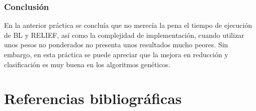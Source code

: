 \documentclass[12pt, spanish]{article}
\begin{document}
\subsubsection{}
\subsubsection{}
\subsubsection{}
\subsubsection{}
\subsubsection{Conclusión}
En la anterior práctica se concluía que no merecía la pena el tiempo de ejecución de BL y RELIEF, así como la complejidad de implementación, cuando utilizar unos pesos no ponderados no presenta unos resultados mucho peores. Sin embargo, en esta práctica se puede apreciar que la mejora en reducción y clasificación es muy buena en los algoritmos genéticos. 
\pagebreak
\section{Referencias bibliográficas}
\end{document}
